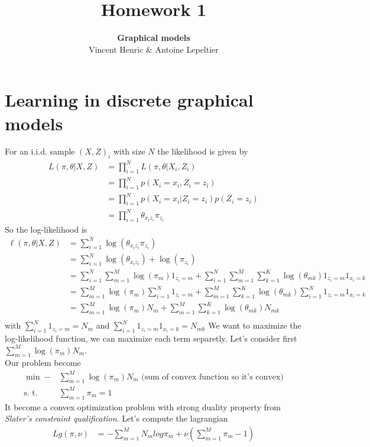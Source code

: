 \documentclass[french]{article}
\title{Homework 1}
\author{ \textbf{Graphical models} \\Vincent Henric \& Antoine Lepeltier }
\date{}
\begin{document}
	
	\maketitle
	
	\section{Learning in discrete graphical models}
\noindent
For an i.i.d. sample $(X,Z)_i$ with size $N$ the likelihood is given by 
\begin{align*}
L(\pi,\theta | X,Z ) &= \prod_{i=1}^N L(\pi,\theta | X_i,Z_i ) \\
&=  \prod_{i=1}^N p(X_i=x_i, Z_i=z_i ) \\
&=  \prod_{i=1}^N p(X_i=x_i | Z_i=z_i ) p(Z_i=z_i)\\
&=  \prod_{i=1}^N \theta_{x_iz_i} \pi_{z_i}
\end{align*}
So the log-likelihood is
\begin{align*}
\ell (\pi,\theta | X,Z ) &= \sum_{i=1}^N \log(\theta_{x_iz_i} \pi_{z_i}) \\
&= \sum_{i=1}^N \log(\theta_{x_iz_i}) + \log( \pi_{z_i}) \\
&= \sum_{i=1}^N  \sum_{m=1}^M  \log( \pi_{m}) 1_{z_i=m} + \sum_{i=1}^N \sum_{m=1}^M  \sum_{k=1}^K\log(\theta_{mk}) 1_{z_i=m} 1_{x_i=k}\\
&= \sum_{m=1}^M  \log( \pi_{m})  \sum_{i=1}^N 1_{z_i=m} + \sum_{m=1}^M  \sum_{k=1}^K\log(\theta_{mk}) \sum_{i=1}^N 1_{z_i=m} 1_{x_i=k}\\
&= \sum_{m=1}^M  \log( \pi_{m})  N_m + \sum_{m=1}^M  \sum_{k=1}^K\log(\theta_{mk}) N_{mk}\\
\end{align*}
with $\sum_{i=1}^N 1_{z_i=m} = N_m$ and $\sum_{i=1}^N 1_{z_i=m} 1_{x_i=k}=N_{mk}$
We want to maximize the log-likelihood function, we can maximize each term separetly. Let's consider first $\sum_{m=1}^M  \log( \pi_{m})  N_m$.\\
Our problem become
\begin{align*}
\min  -&\sum_{m=1}^M  \log( \pi_{m})  N_m \text{ (sum of convex function so it's convex)}\\
\text{s. t. }  &\sum_{m=1}^M \pi_m = 1 
\end{align*}
It become a convex optimization problem with strong duality property from \textit{Slater’s constraint qualification}. Let's compute the lagrangian
\begin{align*}
Lg(\pi,\nu) &= - \sum_{m=1}^M N_m log{\pi_m} + \nu(\sum_{m=1}^M \pi_m - 1)
\end{align*}
\end{document}
